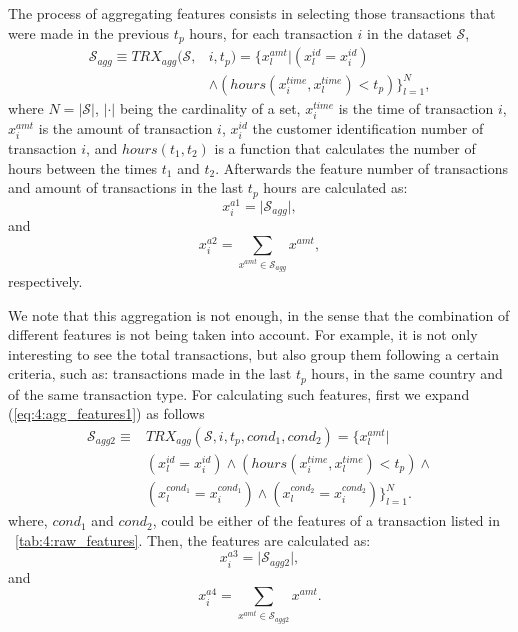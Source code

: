   The process of aggregating features consists in  selecting those transactions that were made in 
  the previous $t_p$ hours, for each transaction $i$ in the dataset $\mathcal{S}$,
	\begin{align}\label{eq:4:agg_features1}
	\mathcal{S}_{agg} \equiv	TRX_{agg}(\mathcal{S},& i, t_p) = \bigg\{x_l^{amt} \bigg\vert 
\left(x_l^{id}=x_i^{id}\right) \nonumber \\
		&\wedge \left(hours(x_i^{time},x_l^{time}) < t_p\right) \bigg\}_{l=1}^N,
	\end{align}
  where $N=\vert\mathcal{S}\vert$, $\vert \cdot \vert$ being the cardinality of a set, $x_i^{time}$ 
  is the time of transaction $i$,  $x_i^{amt}$ is the amount of transaction $i$, $x_i^{id}$  the 
  customer identification number of transaction $i$, and $hours(t_1,t_2)$ is  a function that 
  calculates the number of hours between the times $t_1$  and $t_2$. Afterwards the feature number 
  of transactions and amount of transactions in the last $t_p$ hours are calculated as:
  \begin{equation}\label{eq:4:agg1a}
    x_i^{a1} = \vert \mathcal{S}_{agg} \vert ,
  \end{equation}
  and   
  \begin{equation}\label{eq:4:agg1b}
  x_i^{a2} = \sum_{x^{amt} \in   \mathcal{S}_{agg} } x^{ amt},
  \end{equation}
  respectively.
	
  We note that this aggregation is not enough, in the sense that the combination 
  of  different features is not being taken into account. For example, it is not only 
  interesting   to see the total transactions, but also group them following a certain criteria, 
  such as: transactions   made in the last $t_p$ hours, in the same country   and of the same 
  transaction type. For   calculating such features, first we expand (\ref{eq:4:agg_features1}) as 
  follows
	\begin{align}\label{eq:4:agg_features2}
		\mathcal{S}_{agg2} \equiv & TRX_{agg}(\mathcal{S}  ,i, t_p, cond_1, cond_2) = \bigg\{ x_l^{amt} 
\bigg\vert \nonumber \\  
		& \left(x_l^{id}=x_i^{id}\right) \wedge  \left(hours(x_i^{time},x_l^{time})<  t_p\right) 
    \wedge \nonumber \\ 	
    &  \left(x_l^{cond_1} = x_i^{cond_1}\right) \wedge	\left(x_l^{cond_2} = 
		x_i^{cond_2}\right) \bigg\}_{l=1}^N.
		\end{align}
  where, $cond_1$ and $cond_2$, could be either of the features of a transaction listed in 
  \tablename{~\ref{tab:4:raw_features}}. Then, the features are calculated as:
  \begin{equation}\label{eq:4:agg2a}
     x_i^{a3} = \vert \mathcal{S}_{agg2} \vert ,
  \end{equation}
  and   
  \begin{equation}\label{eq:4:agg2b}
  x_i^{a4} = \sum_{x^{amt} \in   \mathcal{S}_{agg2}} x^{ amt}.
  \end{equation}


